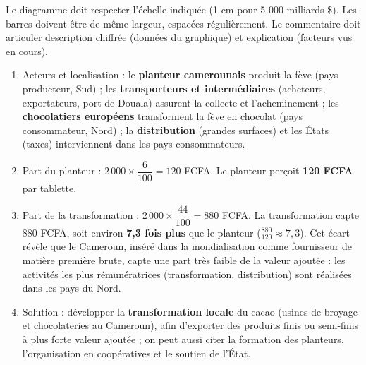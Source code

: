 \documentclass[11pt]{article}
\begin{document}
\begin{attention}
Le diagramme doit respecter l'échelle indiquée (1 cm pour 5 000 milliards \$). Les barres doivent être de même largeur, espacées régulièrement. Le commentaire doit articuler description chiffrée (données du graphique) et explication (facteurs vus en cours).
\end{attention}

\begin{corrige}
\begin{enumerate}
\item Acteurs et localisation : le \textbf{planteur camerounais} produit la fève (pays producteur, Sud) ; les \textbf{transporteurs et intermédiaires} (acheteurs, exportateurs, port de Douala) assurent la collecte et l'acheminement ; les \textbf{chocolatiers européens} transforment la fève en chocolat (pays consommateur, Nord) ; la \textbf{distribution} (grandes surfaces) et les États (taxes) interviennent dans les pays consommateurs.
\item Part du planteur : $2\,000 \times \dfrac{6}{100} = 120$ FCFA. Le planteur perçoit \textbf{120 FCFA} par tablette.
\item Part de la transformation : $2\,000 \times \dfrac{44}{100} = 880$ FCFA. La transformation capte 880 FCFA, soit environ \textbf{7,3 fois plus} que le planteur ($\frac{880}{120} \approx 7,3$). Cet écart révèle que le Cameroun, inséré dans la mondialisation comme fournisseur de matière première brute, capte une part très faible de la valeur ajoutée : les activités les plus rémunératrices (transformation, distribution) sont réalisées dans les pays du Nord.
\item Solution : développer la \textbf{transformation locale} du cacao (usines de broyage et chocolateries au Cameroun), afin d'exporter des produits finis ou semi-finis à plus forte valeur ajoutée ; on peut aussi citer la formation des planteurs, l'organisation en coopératives et le soutien de l'État.
\end{enumerate}
\end{corrige}
\end{document}
